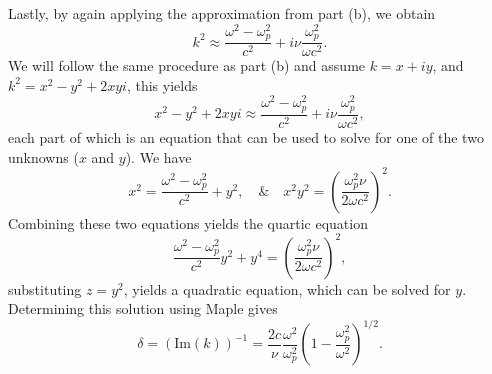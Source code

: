 Lastly, by again applying the approximation from part (b), we obtain
\begin{equation*}
	k^2 \approx \dfrac{\omega^2 - \omega_p^2}{c^2} + i\nu\dfrac{\omega^2_p}{\omega c^2}.
\end{equation*}
We will follow the same procedure as part (b) and assume \(k = x + iy \), and \(k^2 = x^2 - y^2 + 2xyi \), this yields 
\begin{equation*}
	x^2 - y^2 + 2xyi \approx \dfrac{\omega^2 - \omega^2_p}{c^2} + i\nu\dfrac{\omega^2_p}{\omega c^2},
\end{equation*}
each part of which is an equation that can be used to solve for one of the two unknowns (\(x\) and \(y\)). We have
\begin{equation*}
	x^2 = \dfrac{\omega^2 - \omega^2_p}{c^2} + y^2, \quad \& \quad x^2y^2 = \left(\dfrac{\omega^2_p\nu}{2\omega c^2}\right)^2.
\end{equation*}
Combining these two equations yields the quartic equation
\begin{equation*}
	\dfrac{\omega^2 - \omega^2_p}{c^2}y^2 + y^4 = \left(\dfrac{\omega^2_p\nu}{2\omega c^2}\right)^2,
\end{equation*}
substituting \(z = y^2\), yields a quadratic equation, which can be solved for \(y\). Determining this solution using Maple gives
\begin{equation*}
	\delta = \left(\text{Im}(k)\right)^{-1} = \dfrac{2c}{\nu}\dfrac{\omega^2}{\omega_p^2}\left(1 - \dfrac{\omega^2_p}{\omega^2}\right)^{1/2}.
\end{equation*}



